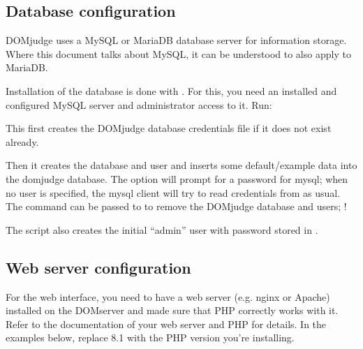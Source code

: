 \documentclass[a4paper,10pt,english,openany]{sphinxmanual}
\begin{document}
\subsection{Database configuration}
\label{\detokenize{install-domserver:database-configuration}}
\sphinxAtStartPar
DOMjudge uses a MySQL or MariaDB database server for information storage.
Where this document talks about MySQL, it can be understood to also apply
to MariaDB.

\sphinxAtStartPar
Installation of the database is done with .
For this, you need an installed and configured MySQL server and
administrator access to it. Run:

\begin{sphinxVerbatim}[commandchars=\\\{\}]
 
 \PYG{p}{[}   \PYG{p}{]} \PYG{p}{[} \PYG{p}{]} 
\end{sphinxVerbatim}

\sphinxAtStartPar
This first creates the DOMjudge database credentials file
 if it does not exist already.

\sphinxAtStartPar
Then it creates the database and user and inserts some
default/example data into the domjudge database. The option
 will prompt for a password for mysql; when no user is
specified, the mysql client will try to read
credentials from  as usual. The command
 can be passed to  to
remove the DOMjudge database and users; !

\sphinxAtStartPar
The script also creates the initial “admin” user with password
stored in .


\subsection{Web server configuration}
\label{\detokenize{install-domserver:web-server-configuration}}
\sphinxAtStartPar
For the web interface, you need to have a web server (e.g. nginx or Apache)
installed on the DOMserver and made sure that PHP correctly works
with it. Refer to the documentation of your web server and PHP for
details. In the examples below, replace 8.1 with the PHP version
you’re installing.
\end{document}
